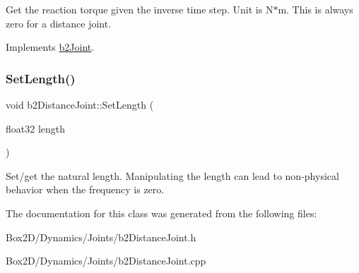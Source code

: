 Get the reaction torque given the inverse time step. Unit is N$\ast$m. This is always zero for a distance joint. 

Implements \hyperlink{classb2_joint_ae355e441c2aa842777dc04e24f15ced0}{b2\+Joint}.

\mbox{\label{classb2_distance_joint_a950a0f187ef691208e50de40ed9223fe}} 
\subsubsection{\texorpdfstring{Set\+Length()}{SetLength()}}
{\footnotesize\ttfamily void b2\+Distance\+Joint\+::\+Set\+Length (\begin{DoxyParamCaption}\item[{float32}]{length }\end{DoxyParamCaption})\hspace{0.3cm}{\ttfamily [inline]}}

Set/get the natural length. Manipulating the length can lead to non-\/physical behavior when the frequency is zero. 

The documentation for this class was generated from the following files\+:\begin{DoxyCompactItemize}
\item 
Box2\+D/\+Dynamics/\+Joints/b2\+Distance\+Joint.\+h\item 
Box2\+D/\+Dynamics/\+Joints/b2\+Distance\+Joint.\+cpp\end{DoxyCompactItemize}

